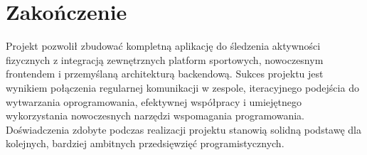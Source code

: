 \documentclass[12pt,a4paper]{report}
\begin{document}
\section{Zakończenie}

Projekt pozwolił zbudować kompletną aplikację do śledzenia aktywności fizycznych z integracją zewnętrznych platform sportowych, nowoczesnym frontendem i przemyślaną architekturą backendową. Sukces projektu jest wynikiem połączenia regularnej komunikacji w zespole, iteracyjnego podejścia do wytwarzania oprogramowania, efektywnej współpracy i umiejętnego wykorzystania nowoczesnych narzędzi wspomagania programowania. Doświadczenia zdobyte podczas realizacji projektu stanowią solidną podstawę dla kolejnych, bardziej ambitnych przedsięwzięć programistycznych.

\end{document}
